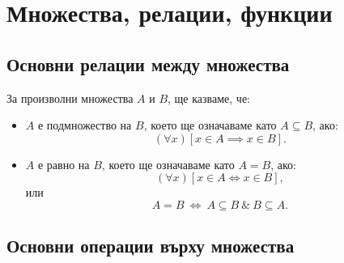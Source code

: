 
\section{Множества, релации, функции}

\subsection*{Основни релации между множества}

За произволни множества $A$ и $B$, ще казваме, че:
\begin{itemize}
\item
  $A$ е подмножество на $B$, което ще означаваме като $A \subseteq B$, ако:
  \[(\forall x)[x \in A \implies x \in B].\]
\item
  $A$ е равно на $B$, което ще означаваме като $A = B$, ако:
  \[(\forall x)[x \in A \iff x \in B],\]
  или
  \[A = B\ \iff\ A \subseteq B\ \&\ B \subseteq A.\]
\end{itemize}

\subsection*{Основни операции върху множества}

